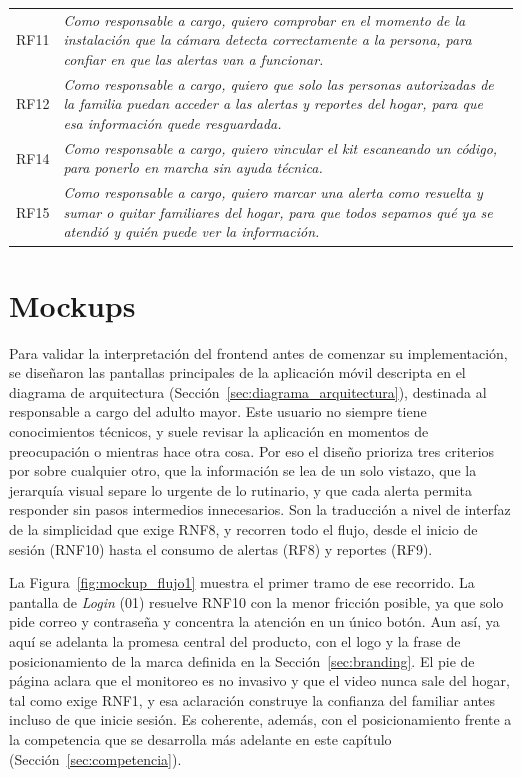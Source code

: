 \begin{longtable}{@{}p{}p{}@{}}
RF11 & \textit{Como responsable a cargo, quiero comprobar en el momento de la instalación que la cámara detecta correctamente a la persona, para confiar en que las alertas van a funcionar.} \\[6pt]
RF12 & \textit{Como responsable a cargo, quiero que solo las personas autorizadas de la familia puedan acceder a las alertas y reportes del hogar, para que esa información quede resguardada.} \\[6pt]
RF14 & \textit{Como responsable a cargo, quiero vincular el kit escaneando un código, para ponerlo en marcha sin ayuda técnica.} \\[6pt]
RF15 & \textit{Como responsable a cargo, quiero marcar una alerta como resuelta y sumar o quitar familiares del hogar, para que todos sepamos qué ya se atendió y quién puede ver la información.} \\
\end{longtable}

\section{Mockups}
\label{sec:mockups}

Para validar la interpretación del frontend antes de comenzar su implementación, se diseñaron las pantallas principales de la aplicación móvil descripta en el diagrama de arquitectura (Sección~\ref{sec:diagrama_arquitectura}), destinada al responsable a cargo del adulto mayor.
Este usuario no siempre tiene conocimientos técnicos, y suele revisar la aplicación en momentos de preocupación o mientras hace otra cosa.
Por eso el diseño prioriza tres criterios por sobre cualquier otro, que la información se lea de un solo vistazo, que la jerarquía visual separe lo urgente de lo rutinario, y que cada alerta permita responder sin pasos intermedios innecesarios.
Son la traducción a nivel de interfaz de la simplicidad que exige RNF8, y recorren todo el flujo, desde el inicio de sesión (RNF10) hasta el consumo de alertas (RF8) y reportes (RF9).

La Figura~\ref{fig:mockup_flujo1} muestra el primer tramo de ese recorrido.
La pantalla de \textit{Login} (01) resuelve RNF10 con la menor fricción posible, ya que solo pide correo y contraseña y concentra la atención en un único botón.
Aun así, ya aquí se adelanta la promesa central del producto, con el logo y la frase de posicionamiento de la marca definida en la Sección~\ref{sec:branding}.
El pie de página aclara que el monitoreo es no invasivo y que el video nunca sale del hogar, tal como exige RNF1, y esa aclaración construye la confianza del familiar antes incluso de que inicie sesión.
Es coherente, además, con el posicionamiento frente a la competencia que se desarrolla más adelante en este capítulo (Sección~\ref{sec:competencia}).

